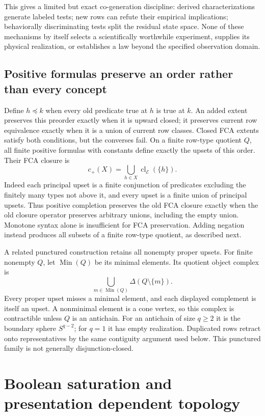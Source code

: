 \documentclass[11pt]{article}
\theoremstyle{definition}
\newcommand{\cl}{\operatorname{cl}}
\begin{document}
This gives a limited but exact co-generation discipline: derived
characterizations generate labeled tests; new rows can refute their
empirical implications; behaviorally discriminating tests split the
residual state space. None of these mechanisms by itself selects a
scientifically worthwhile experiment, supplies its physical realization,
or establishes a law beyond the specified observation domain.

\subsection{Positive formulas preserve an order rather than every concept}

Define $h\preceq k$ when every old predicate true at $h$ is true at $k$.
An added extent preserves this preorder exactly when it is upward closed;
it preserves current row equivalence exactly when it is a union of current
row classes. Closed FCA extents satisfy both conditions, but the converses
fail. On a finite row-type quotient $Q$, all finite positive formulas with
constants define exactly the upsets of this order. Their FCA closure is
\[
 c_{+}(X)=\bigcup_{h\in X}\cl_{\mathcal E}(\{h\}).
\]
Indeed each principal upset is a finite conjunction of predicates excluding
the finitely many types not above it, and every upset is a finite union of
principal upsets. Thus positive completion preserves the old FCA closure
exactly when the old closure operator preserves arbitrary unions, including
the empty union. Monotone
syntax alone is insufficient for FCA preservation. Adding negation instead
produces all subsets of a finite row-type quotient, as described next.

A related punctured construction retains all nonempty proper upsets.
For finite nonempty $Q$, let $\operatorname{Min}(Q)$ be its minimal
elements. Its quotient object complex is
\[
 \bigcup_{m\in\operatorname{Min}(Q)}\Delta(Q\setminus\{m\}).
\]
Every proper upset misses a minimal element, and each displayed complement
is itself an upset. A nonminimal element is a cone vertex, so this complex
is contractible unless $Q$ is an antichain. For an antichain of size $q\ge2$
it is the boundary sphere $S^{q-2}$; for $q=1$ it has empty realization.
Duplicated rows retract onto representatives by the same contiguity argument
used below. This punctured family is not generally disjunction-closed.

\section{Boolean saturation and presentation dependent topology}
\label{sec:saturation}
\end{document}
